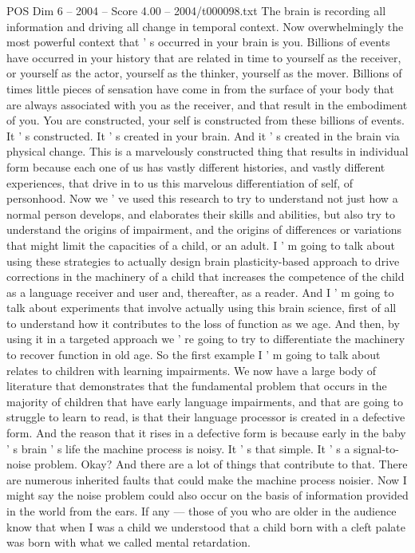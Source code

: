 \begin{textsample}{POS Dim 6 – 2004 – Score 4.00 – 2004/t000098.txt}
The brain is recording all information and driving all change in temporal context.
Now overwhelmingly the most powerful context that ' s occurred in your brain is you.
Billions of events have occurred in your history that are related in time to yourself as the receiver, or yourself as the actor, yourself as the thinker, yourself as the mover.
Billions of times little pieces of sensation have come in from the surface of your body that are always associated with you as the receiver, and that result in the embodiment of you.
You are constructed, your self is constructed from these billions of events.
It ' s constructed.
It ' s created in your brain.
And it ' s created in the brain via physical change.
This is a marvelously constructed thing that results in individual form because each one of us has vastly different histories, and vastly different experiences, that drive in to us this marvelous differentiation of self, of personhood.
Now we ' ve used this research to try to understand not just how a normal person develops, and elaborates their skills and abilities, but also try to understand the origins of impairment, and the origins of differences or variations that might limit the capacities of a child, or an adult.
I ' m going to talk about using these strategies to actually design brain plasticity-based approach to drive corrections in the machinery of a child that increases the competence of the child as a language receiver and user and, thereafter, as a reader.
And I ' m going to talk about experiments that involve actually using this brain science, first of all to understand how it contributes to the loss of function as we age.
And then, by using it in a targeted approach we ' re going to try to differentiate the machinery to recover function in old age.
So the first example I ' m going to talk about relates to children with learning impairments.
We now have a large body of literature that demonstrates that the fundamental problem that occurs in the majority of children that have early language impairments, and that are going to struggle to learn to read, is that their language processor is created in a defective form.
And the reason that it rises in a defective form is because early in the baby ' s brain ' s life the machine process is noisy.
It ' s that simple.
It ' s a signal-to-noise problem.
Okay?
And there are a lot of things that contribute to that.
There are numerous inherited faults that could make the machine process noisier.
Now I might say the noise problem could also occur on the basis of information provided in the world from the ears.
If any — those of you who are older in the audience know that when I was a child we understood that a child born with a cleft palate was born with what we called mental retardation.

\end{textsample}
